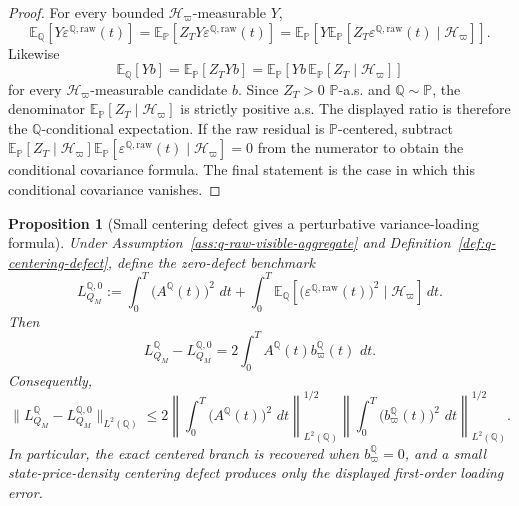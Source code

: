 \documentclass[11pt,a4paper]{amsart}
\theoremstyle{plain}
\newtheorem{proposition}[theorem]{Proposition}
\theoremstyle{definition}
\theoremstyle{remark}
\newcommand{\PP}{\mathbb{P}}
\newcommand{\QQ}{\mathbb{Q}}
\newcommand{\EE}{\mathbb{E}}
\newcommand{\cH}{\mathcal{H}}
\newcommand{\dd}{\,d}
\begin{document}
\begin{proof}
For every bounded \(\cH_\varpi\)-measurable \(Y\),
\[
        \EE_\QQ[Y\varepsilon^{\QQ,\mathrm{raw}}(t)]
        =
        \EE_\PP[Z_TY\varepsilon^{\QQ,\mathrm{raw}}(t)]
        =
        \EE_\PP\!\left[
                Y\EE_\PP[Z_T\varepsilon^{\QQ,\mathrm{raw}}(t)\mid\cH_\varpi]
        \right].
\]
Likewise
\[
        \EE_\QQ[Y b]
        =
        \EE_\PP[Z_TY b]
        =
        \EE_\PP\!\left[Y b\,\EE_\PP[Z_T\mid\cH_\varpi]\right]
\]
for every \(\cH_\varpi\)-measurable candidate \(b\).  Since \(Z_T>0\) \(\PP\)-a.s. and
\(\QQ\sim\PP\), the denominator \(\EE_\PP[Z_T\mid\cH_\varpi]\) is strictly positive a.s.  The
displayed ratio is therefore the \(\QQ\)-conditional expectation.  If the raw residual is
\(\PP\)-centered, subtract
\(\EE_\PP[Z_T\mid\cH_\varpi]\EE_\PP[\varepsilon^{\QQ,\mathrm{raw}}(t)\mid\cH_\varpi]=0\) from
the numerator to obtain the conditional covariance formula.  The final statement is the case in
which this conditional covariance vanishes.
\end{proof}

\begin{proposition}[Small centering defect gives a perturbative variance-loading formula]\label{prop:q-centering-defect-bound}
Under Assumption~\ref{ass:q-raw-visible-aggregate} and
Definition~\ref{def:q-centering-defect}, define the zero-defect benchmark
\[
        L_{Q_M}^{\QQ,0}
        :=
        \int_0^T \bigl(A^\QQ(t)\bigr)^2\,\dd t
        +
        \int_0^T
        \EE_\QQ\!\left[
                \bigl(\varepsilon^{\QQ,\mathrm{raw}}(t)\bigr)^2
                \mid \cH_\varpi
        \right]\dd t.
\]
Then
\[
        L_{Q_M}^\QQ-L_{Q_M}^{\QQ,0}
        =
        2\int_0^T A^\QQ(t)b_\varpi^\QQ(t)\,\dd t.
\]
Consequently,
\[
        \|L_{Q_M}^\QQ-L_{Q_M}^{\QQ,0}\|_{L^2(\QQ)}
        \le
        2
        \left\|
                \int_0^T \bigl(A^\QQ(t)\bigr)^2\,\dd t
        \right\|_{L^2(\QQ)}^{1/2}
        \left\|
                \int_0^T \bigl(b_\varpi^\QQ(t)\bigr)^2\,\dd t
        \right\|_{L^2(\QQ)}^{1/2}.
\]
In particular, the exact centered branch is recovered when \(b_\varpi^\QQ=0\), and a small
state-price-density centering defect produces only the displayed first-order loading error.
\end{proposition}
\end{document}

